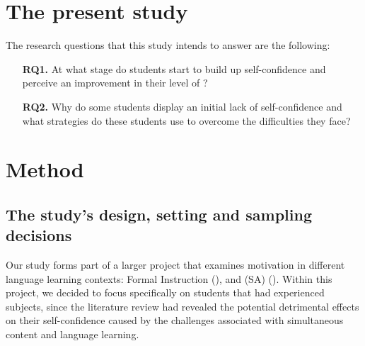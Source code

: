 \documentclass[output=paper]{langsci/langscibook}
\begin{document}
\section{The present study}

The research questions that this study intends to answer are the following:


\begin{itemize}
 \item [\textbf{RQ1.}] At what stage do  students start to build up  self-confi\-dence and perceive an improvement in their level of ?
\item [\textbf{RQ2.}] Why do some  students display an initial lack of self-confidence and what strategies do these students use to overcome the difficulties they face?
\end{itemize}






\section{Method} 

\subsection{The study’s design, setting and sampling decisions}

Our study forms part of a larger project that examines motivation in different language learning contexts: Formal Instruction (),  and  (SA) (\cite{MoratinosJohnstonForthcoming}). Within this project, we decided to focus specifically on students that had experienced  subjects, since the literature review had revealed the potential detrimental effects on their  self-confidence caused by the challenges associated with simultaneous content and language learning. 
\end{document}
